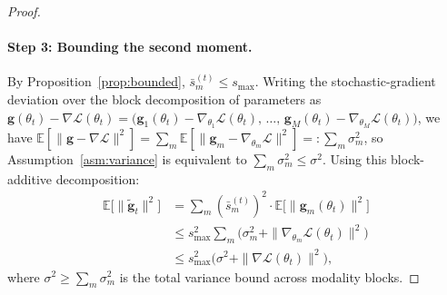 \documentclass{article}
\newcommand{\loss}{\mathcal{L}}
\begin{document}
\begin{proof}
\paragraph{Step 3: Bounding the second moment.}
By Proposition~\ref{prop:bounded}, $\bar{s}_m^{(t)} \leq s_{\max}$. Writing the stochastic-gradient deviation over the block decomposition of parameters as $\mathbf{g}(\theta_t) - \nabla \loss(\theta_t) = \bigl(\mathbf{g}_1(\theta_t) - \nabla_{\theta_1}\loss(\theta_t),\,\dots,\,\mathbf{g}_M(\theta_t) - \nabla_{\theta_M}\loss(\theta_t)\bigr)$, we have $\mathbb{E}[\|\mathbf{g} - \nabla\loss\|^{2}] = \sum_m \mathbb{E}[\|\mathbf{g}_m - \nabla_{\theta_m}\loss\|^{2}] =: \sum_m \sigma_m^{2}$, so Assumption~\ref{asm:variance} is equivalent to $\sum_m \sigma_m^{2} \leq \sigma^{2}$. Using this block-additive decomposition:
%
\begin{align}
\mathbb{E}\bigl[\|\tilde{\mathbf{g}}_t\|^2\bigr]
&= \sum_m (\bar{s}_m^{(t)})^2 \cdot \mathbb{E}\bigl[\|\mathbf{g}_m(\theta_t)\|^2\bigr] \nonumber \\
&\leq s_{\max}^2 \sum_m \bigl(\sigma_m^2 + \|\nabla_{\theta_m} \loss(\theta_t)\|^2\bigr) \nonumber \\
&\leq s_{\max}^2 \bigl(\sigma^2 + \|\nabla \loss(\theta_t)\|^2\bigr),
\label{eq:second_moment}
\end{align}
%
where $\sigma^2 \geq \sum_m \sigma_m^2$ is the total variance bound across modality blocks.


\end{proof}
\end{document}
